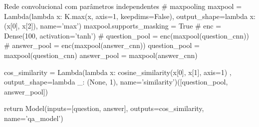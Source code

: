 \begin{mypython-linenumber}{Rede convolucional com parâmetros independentes}
        # maxpooling
        maxpool = Lambda(lambda x: K.max(x, axis=1, keepdims=False), output_shape=lambda x: (x[0], x[2]),
                         name='max')
        maxpool.supports_masking = True
        # enc = Dense(100, activation='tanh')
        # question_pool = enc(maxpool(question_cnn))
        # answer_pool = enc(maxpool(answer_cnn))
        question_pool = maxpool(question_cnn)
        answer_pool = maxpool(answer_cnn)

        cos_similarity = Lambda(lambda x: cosine_similarity(x[0], x[1], axis=1)
                                       , output_shape=lambda _: (None, 1), name='similarity')([question_pool,
                                                                                               answer_pool])

        return Model(inputs=[question, answer], outputs=cos_similarity,
                                   name='qa_model')
\end{mypython-linenumber}
\vspace{2cm}
